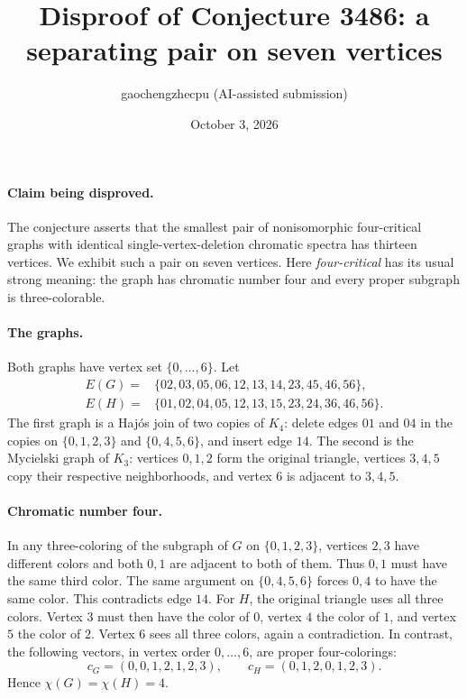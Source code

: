 \documentclass[10pt]{article}
\title{Disproof of Conjecture 3486: a separating pair on seven vertices}
\author{gaochengzhecpu (AI-assisted submission)}
\date{October 3, 2026}
\makeatletter
\renewcommand{\maketitle}{\begin{center}
{\Large\bfseries\@title\par}\vspace{0.6em}
{\small\@author\par\@date}
\end{center}\vspace{0.5em}}
\makeatother
\begin{document}
\maketitle

\paragraph{Claim being disproved.}
The conjecture asserts that the smallest pair of nonisomorphic
four-critical graphs with identical single-vertex-deletion chromatic
spectra has thirteen vertices. We exhibit such a pair on seven vertices.
Here \emph{four-critical} has its usual strong meaning: the graph has
chromatic number four and every proper subgraph is three-colorable.

\paragraph{The graphs.}
Both graphs have vertex set $\{0,\ldots,6\}$. Let
\begin{align*}
E(G)={}&\{02,03,05,06,12,13,14,23,45,46,56\},\\
E(H)={}&\{01,02,04,05,12,13,15,23,24,36,46,56\}.
\end{align*}
The first graph is a Haj\'os join of two copies of $K_4$:
delete edges $01$ and $04$ in the copies on $\{0,1,2,3\}$
and $\{0,4,5,6\}$, and insert edge $14$.
The second is the Mycielski graph of $K_3$: vertices $0,1,2$ form
the original triangle, vertices $3,4,5$ copy their respective
neighborhoods, and vertex $6$ is adjacent to $3,4,5$.

\paragraph{Chromatic number four.}
In any three-coloring of the subgraph of $G$ on $\{0,1,2,3\}$,
vertices $2,3$ have different colors and both $0,1$ are adjacent
to both of them. Thus $0,1$ must have the same third color.
The same argument on $\{0,4,5,6\}$ forces $0,4$ to have the same
color. This contradicts edge $14$.
For $H$, the original triangle uses all three colors.
Vertex $3$ must then have the color of $0$, vertex $4$ the color
of $1$, and vertex $5$ the color of $2$. Vertex $6$ sees all three
colors, again a contradiction.
In contrast, the following vectors, in vertex order $0,\ldots,6$,
are proper four-colorings:
\[
 c_G=(0,0,1,2,1,2,3),\qquad
 c_H=(0,1,2,0,1,2,3).
\]
Hence $\chi(G)=\chi(H)=4$.
\end{document}
